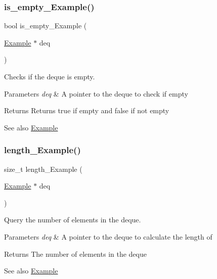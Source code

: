\subsubsection{\texorpdfstring{is\+\_\+empty\+\_\+\+Example()}{is\_empty\_Example()}}
{\footnotesize\ttfamily bool is\+\_\+empty\+\_\+\+Example (\begin{DoxyParamCaption}\item[{\hyperlink{structExample}{Example} $\ast$}]{deq }\end{DoxyParamCaption})}



Checks if the deque is empty. 


\begin{DoxyParams}{Parameters}
{\em deq} & A pointer to the deque to check if empty\\
\hline
\end{DoxyParams}
\begin{DoxyReturn}{Returns}
Returns true if empty and false if not empty
\end{DoxyReturn}
\begin{DoxySeeAlso}{See also}
\hyperlink{structExample}{Example} 
\end{DoxySeeAlso}
\mbox{\label{group__DEQUE_gab751404fe5166cbc70dc8093b5167839}} 
\subsubsection{\texorpdfstring{length\+\_\+\+Example()}{length\_Example()}}
{\footnotesize\ttfamily size\+\_\+t length\+\_\+\+Example (\begin{DoxyParamCaption}\item[{\hyperlink{structExample}{Example} $\ast$}]{deq }\end{DoxyParamCaption})}



Query the number of elements in the deque. 


\begin{DoxyParams}{Parameters}
{\em deq} & A pointer to the deque to calculate the length of\\
\hline
\end{DoxyParams}
\begin{DoxyReturn}{Returns}
The number of elements in the deque
\end{DoxyReturn}
\begin{DoxySeeAlso}{See also}
\hyperlink{structExample}{Example} 
\end{DoxySeeAlso}
\mbox{\label{group__DEQUE_ga4a210705b6f22fe97b7033bb8854a4d6}} 
